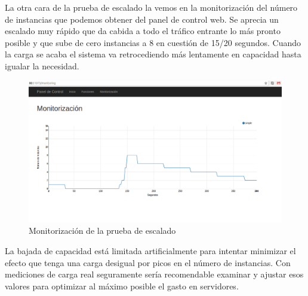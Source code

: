 La otra cara de la prueba de escalado la vemos en la monitorización del número de instancias que podemos obtener del panel de control web. Se aprecia un escalado muy rápido que da cabida a todo el tráfico entrante lo más pronto posible y que sube de cero instancias a 8 en cuestión de 15/20 segundos. Cuando la carga se acaba el sistema va retrocediendo más lentamente en capacidad hasta igualar la necesidad.

\begin{figure}[H]
    \centering
    \includegraphics[width=\textwidth]{../images/fnapi/monitoring.png}
    \caption{Monitorización de la prueba de escalado}
    \label{fig:monitoring-scale}
\end{figure}

La bajada de capacidad está limitada artificialmente para intentar minimizar el efecto que tenga una carga desigual por picos en el número de instancias. Con mediciones de carga real seguramente sería recomendable examinar y ajustar esos valores para optimizar al máximo posible el gasto en servidores.
